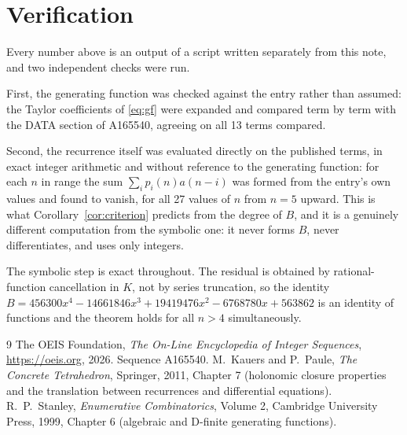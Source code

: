 \documentclass[11pt,a4paper]{article}
\theoremstyle{plain}
\theoremstyle{definition}
\begin{document}
\section{Verification}

Every number above is an output of a script written separately from this note, and two
independent checks were run.

First, the generating function was checked against the entry rather than assumed: the
Taylor coefficients of \eqref{eq:gf} were expanded and compared term by term with the DATA
section of A165540, agreeing on all 13 terms compared.

Second, the recurrence itself was evaluated directly on the published terms, in exact
integer arithmetic and without reference to the generating function: for each $n$ in range
the sum $\sum_{i}p_{i}(n)a(n-i)$ was formed from the entry's own values and found to
vanish, for all 27 values of $n$ from $n=5$ upward. This is what
Corollary~\ref{cor:criterion} predicts from the degree of $B$, and it is a genuinely
different computation from the symbolic one: it never forms $B$, never differentiates, and
uses only integers.

The symbolic step is exact throughout. The residual is obtained by rational-function
cancellation in $K$, not by series truncation, so the identity $B=456300 x^{4} - 14661846 x^{3} + 19419476 x^{2} - 6768780 x + 563862$ is an
identity of functions and the theorem holds for all $n>4$ simultaneously.

\begin{thebibliography}{9}
 The OEIS Foundation, \emph{The On-Line Encyclopedia of Integer Sequences},
\url{https://oeis.org}, 2026. Sequence A165540.
 M.~Kauers and P.~Paule, \emph{The Concrete Tetrahedron}, Springer, 2011,
Chapter 7 (holonomic closure properties and the translation between recurrences and
differential equations).
 R.~P.~Stanley, \emph{Enumerative Combinatorics}, Volume 2, Cambridge
University Press, 1999, Chapter 6 (algebraic and D-finite generating functions).
\end{thebibliography}
\end{document}
